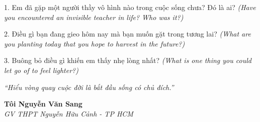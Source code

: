 \begin{tcolorbox}[
  colback=truyengold!10, colframe=truyengold!70!black,
  coltitle=black, fonttitle=\bfseries,
  title={T\textit{ự} H\textit{ọ}c Nhanh},
  arc=4pt, boxrule=1pt, breakable, enhanced
]
1. Em đã gặp một người thầy vô hình nào trong cuộc sống chưa? Đó là ai? \textit{(Have you encountered an invisible teacher in life? Who was it?)}

2. Điều gì bạn đang gieo hôm nay mà bạn muốn gặt trong tương lai? \textit{(What are you planting today that you hope to harvest in the future?)}

3. Buông bỏ điều gì khiến em thấy nhẹ lòng nhất? \textit{(What is one thing you could let go of to feel lighter?)}
\end{tcolorbox}

\begin{center}
\textit{\color{truyengold}``Hiểu vòng quay cuộc đời là bắt đầu sống có chủ đích.''}
\end{center}

\begin{flushright}
\textbf{Tôi Nguyễn Văn Sang}\\
\textit{GV THPT Nguyễn Hữu Cảnh - TP HCM}
\end{flushright}

\ngancach

